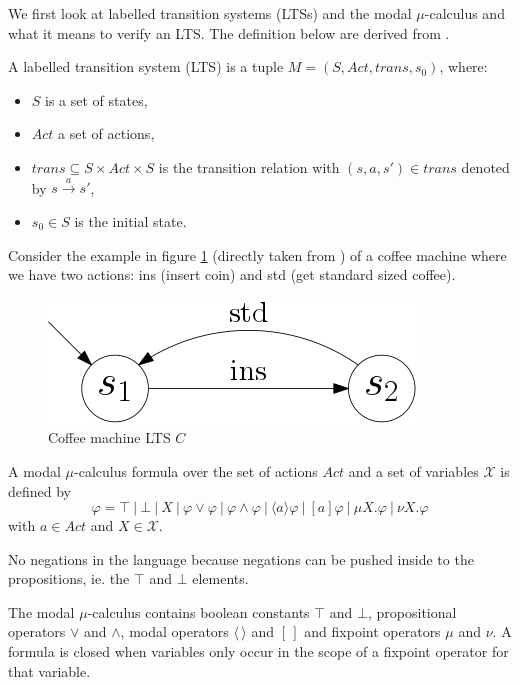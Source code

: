 We first look at labelled transition systems (LTSs) and the modal $\mu$-calculus and what it means to verify an LTS. The definition below are derived from \cite{Groote}.
\begin{definition}
	\label{def_lts}A labelled transition system (LTS) is a tuple $M = (S, Act, trans, s_0)$, where:
	\begin{itemize}
		\item $S$ is a set of states,
		\item $Act$ a set of actions,
		\item $trans \subseteq S \times Act \times S$ is the transition relation with $(s,a,s') \in trans$ denoted by $s \xrightarrow a s'$,
		\item $s_0 \in S$ is the initial state.
	\end{itemize}
\end{definition}
Consider the example in figure \ref{fig:coffeemachinebasiceurolts} (directly taken from \cite{FamBasedModelCheckingWithMCRL2}) of a coffee machine where we have two actions: ins (insert coin) and std (get standard sized coffee).\\
\begin{figure}[h]
	\centering
	\includegraphics[scale=0.5]{Examples/CoffeeMachine/BasicEuroLTS}
	\caption[Coffee machine LTS]{Coffee machine LTS $C$}
	\label{fig:coffeemachinebasiceurolts}
\end{figure}


\begin{definition}
	\label{def_mu_syntax}
	A modal $\mu$-calculus formula over the set of actions $Act$ and a set of variables $\mathcal{X}$ is defined by
	\[ \varphi = \top\ |\ \bot\ |\ X\ |\ \varphi \vee \varphi\ |\ \varphi \wedge \varphi\ |\ \langle a \rangle \varphi\ |\ [a]\varphi\ |\ \mu X.\varphi\ |\ \nu X.\varphi \]
	with $a \in Act$ and $X \in \mathcal{X}$. 
	
	
	No negations in the language because negations can be pushed inside to the propositions, ie. the $\top$ and $\bot$ elements.
\end{definition}
The modal $\mu$-calculus contains boolean constants $\top$ and $\bot$, propositional operators $\vee$ and $\wedge$, modal operators $\langle \, \rangle$ and $[ \, ]$ and fixpoint operators $\mu$ and $\nu$. A formula is closed when variables only occur in the scope of a fixpoint operator for that variable.

